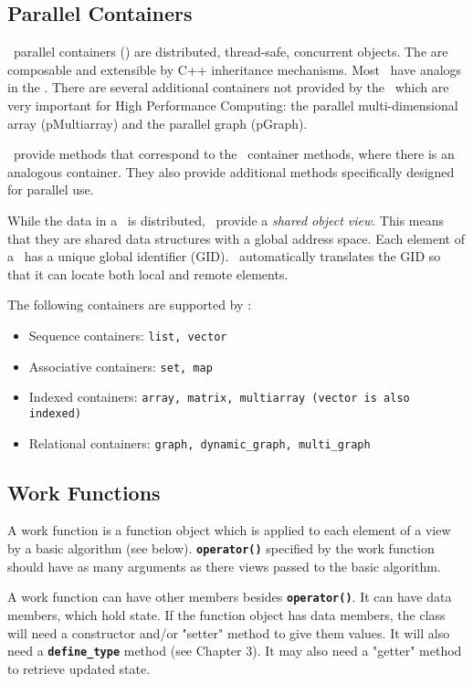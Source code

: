 \documentclass{report}
\begin{document}
\subsection{Parallel Containers}
\label{para-cont-subsect}

\stapl\ parallel containers (\pcontainers) are distributed,
thread-safe, concurrent objects.  The are composable and extensible
by C++ inheritance mechanisms.  Most \pcontainers\ have analogs in the
\stl.  There are several additional containers not provided by the \stl\
which are very important for High Performance Computing: the parallel
multi-dimensional array (pMultiarray) and the parallel graph (pGraph).

\pcontainers\ provide methods that correspond to the \stl\ container
methods, where there is an analogous container.  They also provide
additional methods specifically designed for parallel use.

While the data in a \pcontainer\ is distributed, \pcontainers\ provide a
\emph{shared object view}.  This means that they are shared data structures
with a global address space.  Each element of a \pcontainer\ has a unique
global identifier (GID).  \stapl\ automatically translates the GID so that
it can locate both local and remote elements.

The following containers are supported by \stapl:
\begin{itemize}
\item
Sequence containers: {\tt list, vector }
\item
Associative containers: {\tt set, map }
\item
Indexed containers: {\tt array, matrix, multiarray (vector is also indexed) }
\item
Relational containers: {\tt graph, dynamic\_graph, multi\_graph }
\end{itemize}

\subsection{Work Functions}
\label{work-func-subsect}

A work function is a function object which is applied to each element
of a view by a basic algorithm (see below).
\texttt{{\bf operator()}}
specified by the work function
should have as many arguments as there views passed to the basic algorithm.

A work function can have other members besides
\texttt{{\bf operator()}}.
It can have data members, which hold state.
If the function object has data members, the class will need
a constructor and/or "setter" method to give them values.  It will
also need a
\texttt{{\bf define\_type}}
method (see Chapter 3).
It may also need a "getter" method to retrieve updated state.
\end{document}
